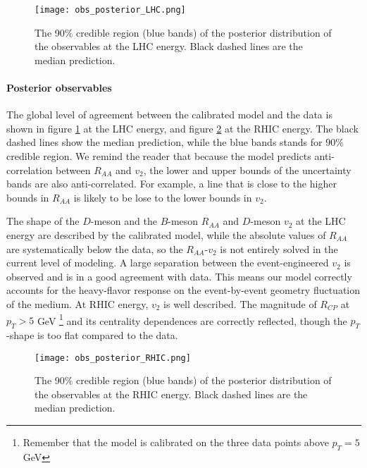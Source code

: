 \begin{figure}
\singlespacing
\centering
\texttt{[image: obs\_posterior\_LHC.png]}
\caption[The 90\% credible region (blue bands) of the posterior distribution]{The 90\% credible region (blue bands) of the posterior distribution of the observables at the LHC energy. Black dashed lines are the median prediction.}
\label{fig:new:obs_posterior_LHC}
\end{figure}

\paragraph{Posterior observables} The global level of agreement between the calibrated model and the data is shown in figure \ref{fig:new:obs_posterior_LHC} at the LHC energy, and figure \ref{fig:new:obs_posterior_RHIC} at the RHIC energy.
The black dashed lines show the median prediction, while the blue bands stands for $90\%$ credible region.
We remind the reader that because the model predicts anti-correlation between $R_{AA}$ and $v_2$, the lower and upper bounds of the uncertainty bands are also anti-correlated.
For example, a line that is close to the higher bounds in $R_{AA}$ is likely to be lose to the lower bounds in $v_2$.

The shape of the $D$-meson and the $B$-meson $R_{AA}$ and $D$-meson $v_2$ at the LHC energy are described by the calibrated model, while the absolute values of $R_{AA}$ are systematically below the data, so the $R_{AA}$-$v_2$ is not entirely solved in the current level of modeling.
A large separation between the event-engineered $v_2$ is observed and is in a good agreement with data.
This means our model correctly accounts for the heavy-flavor response on the event-by-event geometry fluctuation of the medium.
At RHIC energy, $v_2$ is well described.  
The magnitude of $R_{CP}$ at $p_T> 5$ GeV \footnote{\singlespacing  Remember that the model is calibrated on the three data points above $p_T=5$ GeV} and its centrality dependences are correctly reflected, though the $p_T$-shape is too flat compared to the data.

\begin{figure}
\singlespacing
\centering
\texttt{[image: obs\_posterior\_RHIC.png]}
\caption[The 90\% credible region (blue bands) of the posterior distribution]{The 90\% credible region (blue bands) of the posterior distribution of the observables at the RHIC energy. Black dashed lines are the median prediction.}
\label{fig:new:obs_posterior_RHIC}
\end{figure}


